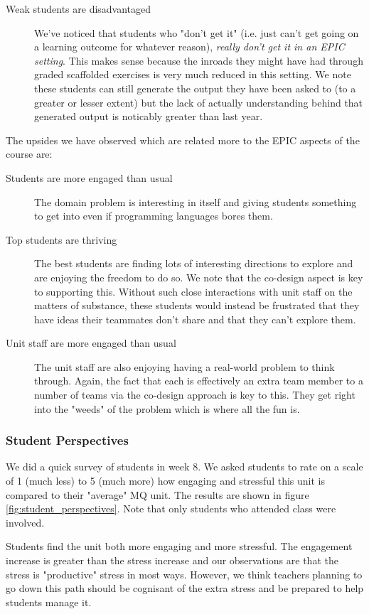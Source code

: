 \documentclass[twoside=false,DIV=14]{scrartcl}
\begin{document}
\begin{description}
\item[Weak students are disadvantaged]  We've noticed that students who "don't get it" (i.e. just can't get going on a learning outcome for whatever reason), \emph{really don't get it in an EPIC setting}.  This makes sense because the inroads they might have had through graded scaffolded exercises is very much reduced in this setting.  We note these students can still generate the output they have been asked to (to a greater or lesser extent) but the lack of actually understanding behind that generated output is noticably greater than last year. 
\end{description}

The upsides we have observed which are related more to the EPIC aspects of the course are:
\begin{description}
  \item[Students are more engaged than usual]  The domain problem is interesting in itself and giving students something to get into even if programming languages bores them.
  \item[Top students are thriving]  The best students are finding lots of interesting directions to explore and are enjoying the freedom to do so.  We note that the co-design aspect is key to supporting this.  Without such close interactions with unit staff on the matters of substance, these students would instead be frustrated that they have ideas their teammates don't share and that they can't explore them.
  \item[Unit staff are more engaged than usual]  The unit staff are also enjoying having a real-world problem to think through.  Again, the fact that each is effectively an extra team member to a number of teams via the co-design approach is key to this.  They get right into the "weeds" of the problem which is where all the fun is.
\end{description}

\subsubsection*{Student Perspectives}
We did a quick survey of students in week 8.  We asked students to rate on a scale of 1 (much less) to 5 (much more) how engaging and stressful this unit is compared to their "average" MQ unit.  The results are shown in figure \ref{fig:student_perspectives}.  Note that only students who attended class were involved.

Students find the unit both more engaging and more stressful.  The engagement increase is greater than the stress increase and our observations are that the stress is "productive" stress in most ways.  However, we think teachers planning to go down this path should be cognisant of the extra stress and be prepared to help students manage it.
\end{document}
